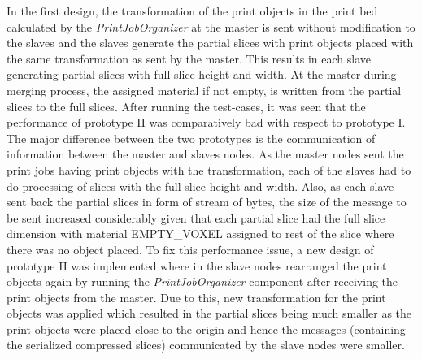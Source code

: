 In the first design, the transformation of the print objects in the print bed calculated by the \textit{PrintJobOrganizer} at the master is sent without modification to the slaves and the slaves generate the partial slices with print objects placed with the same transformation as sent by the master. This results in each slave generating partial slices with full slice height and width. At the master during merging process, the assigned material if not empty, is written from the partial slices to the full slices. After running the test-cases, it was seen that the performance of prototype II was comparatively bad with respect to prototype I. The major difference between the two prototypes is the communication of information between the master and slaves nodes. As the master nodes sent the print jobs having  print objects with the transformation, each of the slaves had to do processing of slices with the full slice height and width. Also, as each slave sent back the partial slices in form of stream of bytes, the size of the message to be sent increased considerably given that each partial slice had the full slice dimension with material EMPTY\_VOXEL assigned to rest of the slice where there was no object placed.  To fix this performance issue, a new design of prototype II was implemented where in the slave nodes rearranged the print objects again by running the \textit{PrintJobOrganizer} component after receiving the print objects from the master. Due to this, new transformation for the print objects was applied which resulted in the partial slices being much smaller as the print objects were placed close to the origin and hence the messages (containing the serialized compressed slices) communicated by the slave nodes were smaller. \newline

